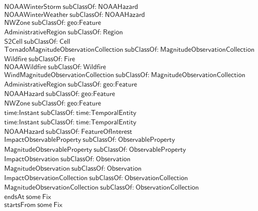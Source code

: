 \begin{align}
  \textsf{NOAAWinterStorm}~\textsf{subClassOf:}~\textsf{NOAAHazard}\\
  \textsf{NOAAWinterWeather}~\textsf{subClassOf:}~\textsf{NOAAHazard}\\
  \textsf{NWZone}~\textsf{subClassOf:}~\textsf{geo:Feature}\\
  \textsf{AdministrativeRegion}~\textsf{subClassOf:}~\textsf{Region}\\
  \textsf{S2Cell}~\textsf{subClassOf:}~\textsf{Cell}\\
  \textsf{TornadoMagnitudeObservationCollection}~\textsf{subClassOf:}~\textsf{MagnitudeObservationCollection}\\
  \textsf{Wildfire}~\textsf{subClassOf:}~\textsf{Fire}\\
  \textsf{NOAAWildfire}~\textsf{subClassOf:}~\textsf{Wildfire}\\
  \textsf{WindMagnitudeObservationCollection}~\textsf{subClassOf:}~\textsf{MagnitudeObservationCollection}\\
  \textsf{AdministrativeRegion}~\textsf{subClassOf:}~\textsf{geo:Feature}\\
  \textsf{NOAAHazard}~\textsf{subClassOf:}~\textsf{geo:Feature}\\
  \textsf{NWZone}~\textsf{subClassOf:}~\textsf{geo:Feature}\\
  \textsf{time:Instant}~\textsf{subClassOf:}~\textsf{time:TemporalEntity}\\
  \textsf{time:Instant}~\textsf{subClassOf:}~\textsf{time:TemporalEntity}\\
  \textsf{NOAAHazard}~\textsf{subClassOf:}~\textsf{FeatureOfInterest}\\
  \textsf{ImpactObservableProperty}~\textsf{subClassOf:}~\textsf{ObservableProperty}\\
  \textsf{MagnitudeObservableProperty}~\textsf{subClassOf:}~\textsf{ObservableProperty}\\
  \textsf{ImpactObservation}~\textsf{subClassOf:}~\textsf{Observation}\\
  \textsf{MagnitudeObservation}~\textsf{subClassOf:}~\textsf{Observation}\\
  \textsf{ImpactObservationCollection}~\textsf{subClassOf:}~\textsf{ObservationCollection}\\
  \textsf{MagnitudeObservationCollection}~\textsf{subClassOf:}~\textsf{ObservationCollection}\\
  \textsf{endsAt}~\textsf{some}~\textsf{Fix}\\
  \textsf{startsFrom}~\textsf{some}~\textsf{Fix}\\

\end{align}
